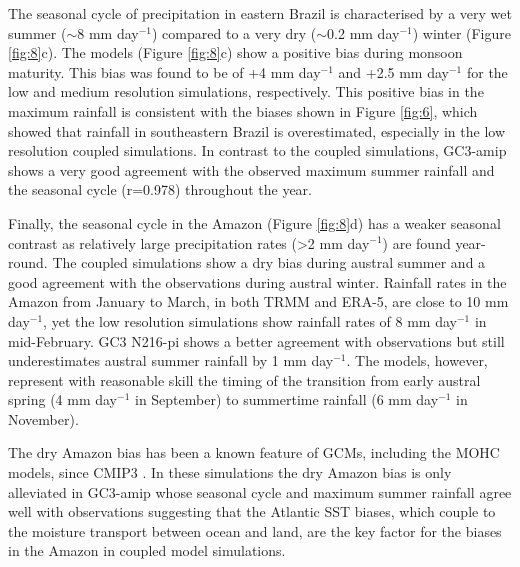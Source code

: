 The seasonal cycle of precipitation in eastern Brazil is characterised by a very wet summer ($\sim$8 mm day$^{-1}$) compared to a very dry ($\sim$0.2 mm day$^{-1}$) winter (Figure \ref{fig:8}c).
The models (Figure \ref{fig:8}c) show a positive bias during monsoon maturity. This bias was found to be of +4 mm day$^{-1}$ and +2.5 mm day$^{-1}$ for the low and medium resolution simulations, respectively.
This positive bias in the maximum rainfall is consistent with the biases shown in Figure \ref{fig:6}, which showed that rainfall in southeastern Brazil is overestimated, especially in the low resolution coupled simulations.   In contrast to the coupled simulations, GC3-amip shows a very good agreement with the observed maximum summer rainfall and the seasonal cycle (r=0.978) throughout the year.

Finally, the seasonal cycle in the Amazon (Figure \ref{fig:8}d) has a weaker seasonal contrast as relatively large precipitation rates  (>2 mm day$^{-1}$) are found year-round. The coupled simulations show a dry bias during austral summer and a good agreement with the observations during austral winter. Rainfall rates in the Amazon from January to March, in both TRMM and ERA-5, are close to 10 mm day$^{-1}$, yet the low resolution simulations show rainfall rates of 8 mm day$^{-1}$ in mid-February.
GC3 N216-pi shows a better agreement with observations but still underestimates austral summer rainfall by 1 mm day$^{-1}$.   
The models, however, represent with reasonable skill the timing of the transition from
early austral spring (4 mm day$^{-1}$ in September) to summertime rainfall (6 mm day$^{-1}$ in November).

The dry Amazon bias has been a known feature of GCMs, including the MOHC models, since CMIP3 \citep{li2006,yin2013}. In these simulations the dry Amazon bias is only alleviated in GC3-amip whose seasonal cycle and maximum summer rainfall agree well with observations suggesting that the Atlantic SST biases, which couple to the moisture transport between ocean and land, are the key factor for the biases in the Amazon in coupled model simulations.   

